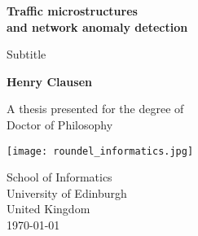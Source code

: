 \begin{titlepage}
   \begin{center}
       \vspace*{1cm}
 		\Huge
       \textbf{Traffic microstructures\\ and network anomaly detection}
       
		\LARGE
       \vspace{0.5cm}
        Subtitle
            
       \vspace{1.5cm}

       \textbf{Henry Clausen}

\BgThispage
       \vfill
            
       A thesis presented for the degree of\\
       Doctor of Philosophy
            
       \vspace{0.8cm}
     


\texttt{[image: roundel\_informatics.jpg]}
            
School of Informatics\\
University of Edinburgh\\
United Kingdom\\
\today
            
   \end{center}
\end{titlepage}